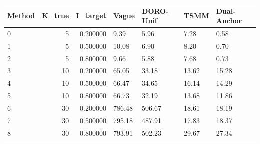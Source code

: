 \begin{tabular}{lrrllll}
\toprule
Method & K_true & I_target & Vague & DORO-Unif & TSMM & Dual-Anchor \\
\midrule
0 & 5 & 0.200000 & 9.39 & 5.96 & 7.28 & 0.58 \\
1 & 5 & 0.500000 & 10.08 & 6.90 & 8.20 & 0.70 \\
2 & 5 & 0.800000 & 9.66 & 5.88 & 7.68 & 0.73 \\
3 & 10 & 0.200000 & 65.05 & 33.18 & 13.62 & 15.28 \\
4 & 10 & 0.500000 & 66.47 & 34.65 & 16.14 & 14.29 \\
5 & 10 & 0.800000 & 66.73 & 32.19 & 13.68 & 11.86 \\
6 & 30 & 0.200000 & 786.48 & 506.67 & 18.61 & 18.19 \\
7 & 30 & 0.500000 & 795.18 & 487.91 & 17.83 & 18.37 \\
8 & 30 & 0.800000 & 793.91 & 502.23 & 29.67 & 27.34 \\
\bottomrule
\end{tabular}

